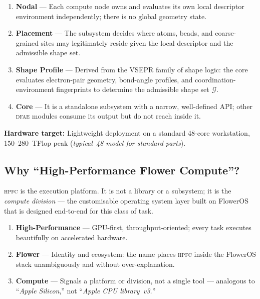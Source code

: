 \documentclass[11pt,a4paper]{article}
\theoremstyle{definition}
\theoremstyle{plain}
\newcommand{\DFAE}{\textsc{dfae}}
\newcommand{\HPFC}{\textsc{hpfc}}
\begin{document}
\begin{enumerate}[label=(\roman*)]
  \item \textbf{Nodal} ---
        Each compute node owns and evaluates its own local
        descriptor environment independently; there is no global
        geometry state.

  \item \textbf{Placement} ---
        The subsystem decides where atoms, beads, and coarse-grained
        sites may legitimately reside given the local descriptor and
        the admissible shape set.

  \item \textbf{Shape Profile} ---
        Derived from the VSEPR family of shape logic: the core
        evaluates electron-pair geometry, bond-angle profiles,
        and coordination-environment fingerprints to determine
        the admissible shape set $\mathcal{G}$.

  \item \textbf{Core} ---
        It is a standalone subsystem with a narrow, well-defined
        API; other \DFAE{} modules consume its output but do not
        reach inside it.
\end{enumerate}

\noindent
\textbf{Hardware target:}
Lightweight deployment on a standard 48-core workstation,
150--280~TFlop peak (\emph{typical~48 model for standard parts}).

\subsection{Why ``High-Performance Flower Compute''?}

\HPFC{} is the execution platform.  It is not a library or a
subsystem; it is the \emph{compute division} --- the customisable
operating system layer built on FlowerOS that is designed end-to-end
for this class of task.

\begin{enumerate}[label=(\roman*)]
  \item \textbf{High-Performance} ---
        GPU-first, throughput-oriented; every task executes
        beautifully on accelerated hardware.

  \item \textbf{Flower} ---
        Identity and ecosystem: the name places \HPFC{} inside the
        FlowerOS stack unambiguously and without over-explanation.

  \item \textbf{Compute} ---
        Signals a platform or division, not a single tool ---
        analogous to ``\emph{Apple Silicon},'' not ``\emph{Apple CPU
        library~v3.}''
\end{enumerate}
\end{document}
